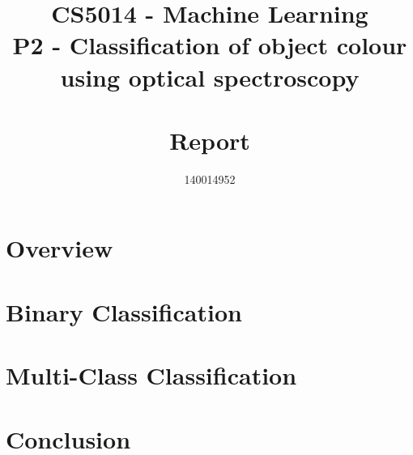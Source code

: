 \documentclass[11pt]{article}
\title{CS5014 - Machine Learning 
\\ \vspace{5mm} \Large P2 - Classification of object colour 
\\ using optical spectroscopy 
\\~\\ Report}
\author{140014952}
\begin{document}
	\maketitle


	\section{Overview}
	\section{Binary Classification}
	\section{Multi-Class Classification}
	\section{Conclusion}
	
\end{document}
